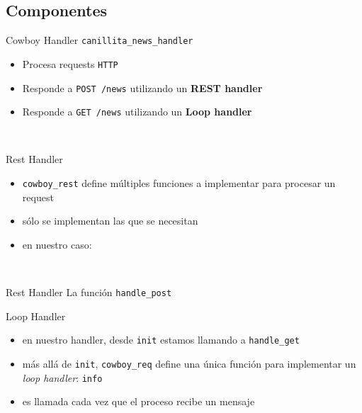 \documentclass[utf8,hyperref={colorlinks=true}]{beamer}
\begin{document}
\subsection{Componentes}
\begin{frame}[t]{Cowboy Handler}
\alert{\texttt{canillita\_news\_handler}}
\begin{itemize}
	\item Procesa requests \texttt{HTTP}
	\item Responde a \texttt{POST /news} utilizando un \textbf{REST handler}
	\item Responde a \texttt{GET /news} utilizando un \textbf{Loop handler}
\end{itemize}
~\\ 
\end{frame}

\begin{frame}[t]{Rest Handler}
\begin{itemize}
	\item \texttt{cowboy\_rest} define m\'ultiples funciones a implementar para procesar un request
	\item s\'olo se implementan las que se necesitan
	\item en nuestro caso:
\end{itemize}
~\\ \restcallbacks
{}\restcallbacksa
\end{frame}

\begin{frame}[t]{Rest Handler}
{La funci\'on \texttt{handle\_post}}
\end{frame}

\begin{frame}{Loop Handler}
\begin{itemize}
	\item en nuestro handler, desde \texttt{init} estamos llamando a \texttt{handle\_get}
	\item m\'as all\'a de \texttt{init}, \texttt{cowboy\_req} define una \'unica funci\'on para implementar un \emph{loop handler}: \texttt{info}
	\item es llamada cada vez que el proceso recibe un mensaje
\end{itemize}
\end{frame}
\end{document}
